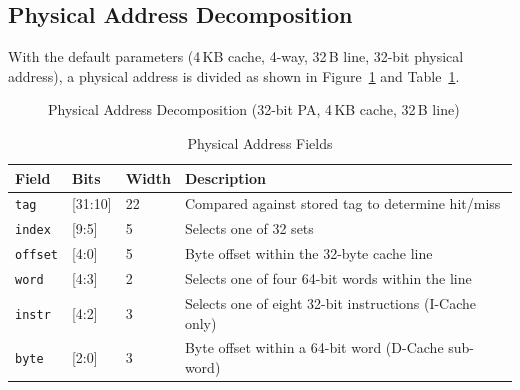 \subsection{Physical Address Decomposition}

With the default parameters (4\,KB cache, 4-way, 32\,B line, 32-bit
physical address), a physical address is divided as shown in
Figure~\ref{fig:asAddrDecomp} and Table~\ref{tab:asAddrFields}.

\begin{figure}[H]
\centering
{}
\caption{Physical Address Decomposition (32-bit PA, 4\,KB cache, 32\,B line)}
\label{fig:asAddrDecomp}
\end{figure}

\begin{table}[H]
\caption{Physical Address Fields}
\label{tab:asAddrFields}
\centering
\begin{tabularx}{\textwidth}{|l |l |l |X|}
  \hline
  Field & Bits & Width & Description \\
  \hline
  \hline
  \texttt{tag}    & [31:10] & 22 & Compared against stored tag to determine hit/miss \\
  \hline
  \texttt{index}  & [9:5]   & 5  & Selects one of 32 sets \\
  \hline
  \texttt{offset} & [4:0]   & 5  & Byte offset within the 32-byte cache line \\
  \hline
  \texttt{word}   & [4:3]   & 2  & Selects one of four 64-bit words within the line \\
  \hline
  \texttt{instr}  & [4:2]   & 3  & Selects one of eight 32-bit instructions (I-Cache only) \\
  \hline
  \texttt{byte}   & [2:0]   & 3  & Byte offset within a 64-bit word (D-Cache sub-word) \\
  \hline
\end{tabularx}
\end{table}

